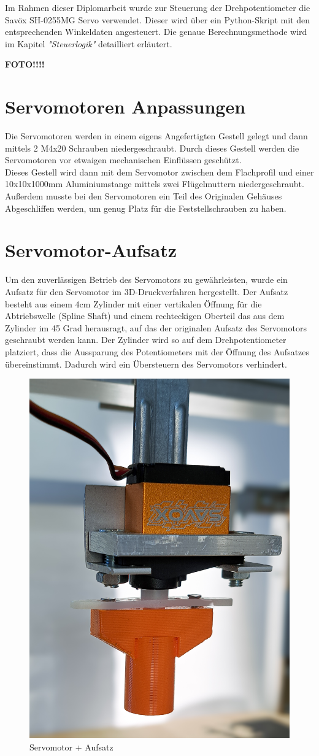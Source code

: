 Im Rahmen dieser Diplomarbeit wurde zur Steuerung der Drehpotentiometer die Savöx SH-0255MG Servo verwendet. Dieser wird über ein Python-Skript mit den entsprechenden Winkeldaten angesteuert. Die genaue Berechnungsmethode wird im Kapitel \textit{"Steuerlogik"} detailliert erläutert.

\textbf{FOTO!!!!}


\section{Servomotoren Anpassungen}
Die Servomotoren werden in einem eigens Angefertigten Gestell gelegt und dann mittels 2 M4x20 Schrauben niedergeschraubt. Durch dieses Gestell werden die Servomotoren vor etwaigen mechanischen Einflüssen geschützt. \\
Dieses Gestell wird dann mit dem Servomotor zwischen dem Flachprofil und einer 10x10x1000mm Aluminiumstange mittels zwei Flügelmuttern niedergeschraubt.\\
Außerdem musste bei den Servomotoren ein Teil des Originalen Gehäuses Abgeschliffen werden, um genug Platz für die Feststellschrauben zu haben.


\section{Servomotor-Aufsatz}
Um den zuverlässigen Betrieb des Servomotors zu gewährleisten, wurde ein Aufsatz für den Servomotor im 3D-Druckverfahren hergestellt. Der Aufsatz besteht aus einem 4cm Zylinder mit einer vertikalen Öffnung für die  Abtriebswelle (Spline Shaft)  und einem rechteckigen Oberteil das aus dem Zylinder im 45 Grad herausragt, auf das der originalen Aufsatz des Servomotors geschraubt werden kann. Der Zylinder wird so auf dem Drehpotentiometer platziert, dass die Aussparung des Potentiometers mit der Öffnung des Aufsatzes übereinstimmt. Dadurch wird ein Übersteuern des Servomotors verhindert.

\begin{figure}[H]
	\centering
	\includegraphics[width=0.25\linewidth]{images/Servomotor+Aufsatz.jpg}
	\caption[Servomotor + Aufsatz]{Servomotor + Aufsatz}
	\label{fig:Servomotor + Aufsatz}
\end{figure}



